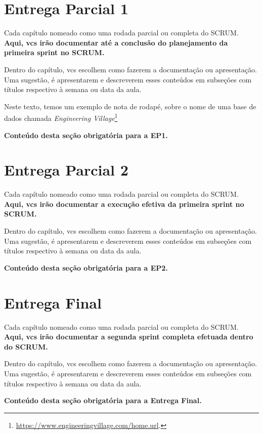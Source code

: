 \documentclass[12pt, oneside, a4paper, chapter=TITLE,section=TITLE]{abntex2}
\begin{document}
\chapter{Entrega Parcial 1}

Cada capítulo nomeado como uma rodada parcial ou completa do SCRUM. \textbf{Aqui, vcs irão documentar até a conclusão do planejamento da primeira sprint no SCRUM.}

Dentro do capítulo, vcs escolhem como fazerem a documentação ou apresentação. Uma sugestão, é apresentarem e descreverem esses conteúdos em subseções com títulos respectivo à semana ou data da aula.

Neste texto, temos um exemplo de nota de rodapé, sobre o nome de uma base de dados chamada \textit{Engineering Village}\footnote{\url{ https://www.engineeringvillage.com/home.url}.}

\textbf{Conteúdo desta seção obrigatória para a EP1.}



\chapter{Entrega Parcial 2}

Cada capítulo nomeado como uma rodada parcial ou completa do SCRUM. \textbf{Aqui, vcs irão documentar a execução efetiva da primeira sprint no SCRUM.}

Dentro do capítulo, vcs escolhem como fazerem a documentação ou apresentação. Uma sugestão, é apresentarem e descreverem esses conteúdos em subseções com títulos respectivo à semana ou data da aula.

\textbf{Conteúdo desta seção obrigatória para a EP2.}



\chapter{Entrega Final}

Cada capítulo nomeado como uma rodada parcial ou completa do SCRUM. \textbf{Aqui, vcs irão documentar a segunda sprint completa efetuada dentro do SCRUM.}

Dentro do capítulo, vcs escolhem como fazerem a documentação ou apresentação. Uma sugestão, é apresentarem e descreverem esses conteúdos em subseções com títulos respectivo à semana ou data da aula.

\textbf{Conteúdo desta seção obrigatória para a Entrega Final.}
\end{document}
